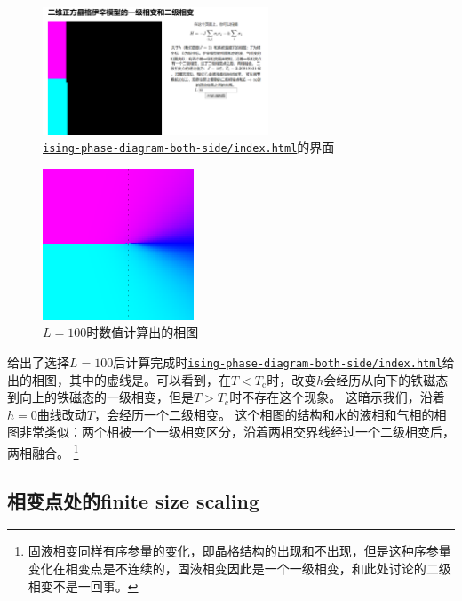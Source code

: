 \documentclass[UTF8]{ctexart}
\begin{document}
\begin{figure}
    \centering
    \includegraphics[width=0.6\textwidth]{../ising-report/ising-phase-diagram-both-side.PNG}
    \caption{\href{../ising-phase-diagram-both-side/index.html}{\texttt{ising-phase-diagram-both-side/index.html}}的界面}
    \label{fig:phase-diagram-gui}
\end{figure}

\begin{figure}
    \centering
    \includegraphics[width=0.4\textwidth]{../ising-report/phase-diagram-L-100.png}
    \caption{$L=100$时数值计算出的相图}
    \label{fig:phase-diagram-example}
\end{figure}

给出了选择$L=100$后计算完成时\href{../ising-phase-diagram-both-side/index.html}{\texttt{ising-phase-diagram-both-side/index.html}}给出的相图，其中的虚线是。可以看到，在$T < T_\text{c}$时，改变$h$会经历从向下的铁磁态到向上的铁磁态的一级相变，但是$T > T_\text{c}$时不存在这个现象。
这暗示我们，沿着$h=0$曲线改动$T$，会经历一个二级相变。
这个相图的结构和水的液相和气相的相图非常类似：两个相被一个一级相变区分，沿着两相交界线经过一个二级相变后，两相融合。%
\footnote{
    固液相变同样有序参量的变化，即晶格结构的出现和不出现，但是这种序参量变化在相变点是不连续的，固液相变因此是一个一级相变，和此处讨论的二级相变不是一回事。
}%

\subsection{相变点处的finite size scaling}
\end{document}
